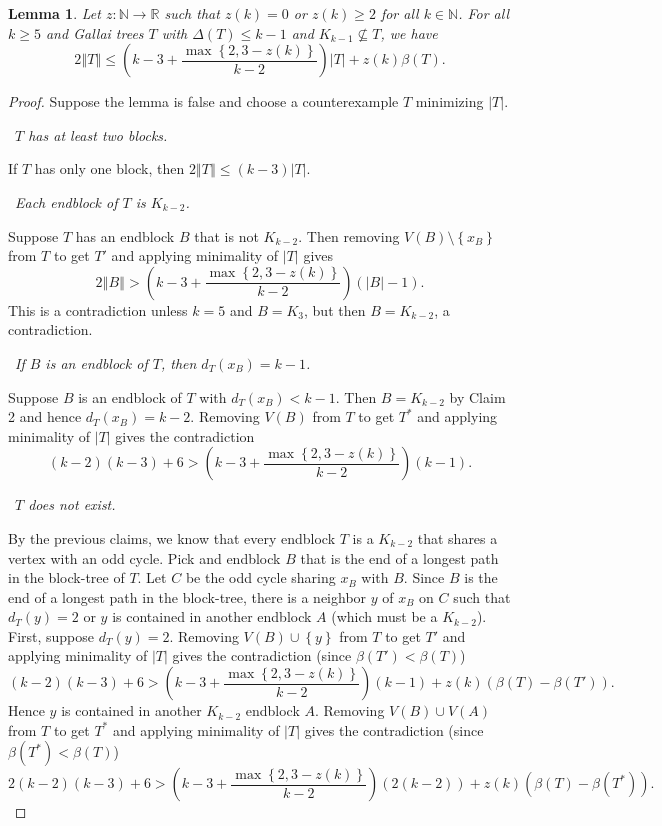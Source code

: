 \documentclass[10pt]{article}
\renewcommand{\ge}{\geqslant}
\renewcommand{\le}{\leqslant}
\theoremstyle{plain}
\newtheorem{lem}[thm]{Lemma}
\theoremstyle{definition}
\theoremstyle{remark}
\newcommand{\IN}{\mathbb{N}}
\newcommand{\IR}{\mathbb{R}}
\newcommand{\set}[1]{\left\{ #1 \right\}}
\newcommand{\card}[1]{\left|#1\right|}
\newcommand{\size}[1]{\left\Vert#1\right\Vert}
\newcommand{\func}[3]{#1\colon #2 \rightarrow #3}
\newcommand{\parens}[1]{\left( #1 \right)}
\newcommand{\claim}[2]{{\bf Claim #1.}~{\it #2}~~}
\begin{document}
\begin{lem}\label{nokkm1}
	Let $\func{z}{\IN}{\IR}$ such that $z(k) = 0$ or $z(k) \ge 2$ for all $k \in \IN$.
	For all $k \ge 5$ and Gallai trees $T$ with $\Delta(T) \le k-1$ and $K_{k-1} \not \subseteq T$, we have
	\[2\size{T} \le \parens{k-3 + \frac{\max\set{2, 3-z(k)}}{k-2}}\card{T} + z(k)\beta(T).\]
\end{lem}
\begin{proof}
Suppose the lemma is false and choose a counterexample $T$ minimizing $\card{T}$.  

\noindent\claim{1}{$T$ has at least two blocks.}

If $T$ has only one block, then $2\size{T} \le \parens{k-3}\card{T}$.

\noindent\claim{2}{Each endblock of $T$ is $K_{k-2}$.}

Suppose $T$ has an endblock $B$ that is not $K_{k-2}$. Then removing $V(B)\setminus\set{x_B}$ from $T$ to get $T'$ and applying minimality of $\card{T}$ gives
\[2\size{B} > \parens{k-3 + \frac{\max\set{2, 3-z(k)}}{k-2}}\parens{\card{B} - 1}.\]
This is a contradiction unless $k=5$ and $B = K_3$, but then $B = K_{k-2}$, a contradiction.

\noindent\claim{3}{If $B$ is an endblock of $T$, then $d_T(x_B) = k-1$.}

Suppose $B$ is an endblock of $T$ with $d_T(x_B) < k-1$.  Then $B = K_{k-2}$ by Claim 2 and hence $d_T(x_B) = k-2$.  Removing $V(B)$ from $T$ to get $T^*$ and applying minimality of $\card{T}$ gives
the contradiction
\[(k-2)(k-3) + 6 > \parens{k-3 + \frac{\max\set{2, 3-z(k)}}{k-2}}\parens{k-1}.\]

\noindent\claim{4}{$T$ does not exist.}

By the previous claims, we know that every endblock $T$ is a $K_{k-2}$ that shares a vertex with an odd cycle.  Pick and endblock $B$ that is the end of a
longest path in the block-tree of $T$.  Let $C$ be the odd cycle sharing $x_B$ with $B$.  Since $B$ is the end of a longest path in the block-tree, there is
a neighbor $y$ of $x_B$ on $C$ such that $d_T(y) = 2$ or $y$ is contained in another endblock $A$ (which must be a $K_{k-2}$).  
First, suppose $d_T(y) = 2$.
Removing $V(B) \cup \set{y}$ from $T$ to get $T'$ and applying minimality of $\card{T}$ gives the contradiction (since $\beta(T') < \beta(T)$)
\[(k-2)(k-3) + 6 > \parens{k-3 + \frac{\max\set{2, 3-z(k)}}{k-2}}\parens{k-1} + z(k)(\beta(T) - \beta(T')).\]
Hence $y$ is contained in another $K_{k-2}$ endblock $A$.  Removing $V(B) \cup V(A)$ from $T$ to get $T^*$ and applying minimality of $\card{T}$ gives
the contradiction (since $\beta(T^*) < \beta(T)$)
\[2(k-2)(k-3) + 6 > \parens{k-3 + \frac{\max\set{2, 3-z(k)}}{k-2}}\parens{2(k-2)} + z(k)(\beta(T) - \beta(T^*)).\]
\end{proof}
\end{document}
